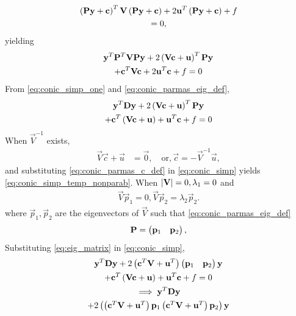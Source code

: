 \documentclass[journal,12pt,twocolumn]{IEEEtran}
\renewcommand\thesection{\arabic{section}}
\renewcommand\thesubsection{\thesection.\arabic{subsection}}
\begin{document}
\begin{enumerate}[label=\thesubsection.\arabic*.,ref=\thesubsection.\theenumi]
\begin{multline}
\left(\mathbf{P}\mathbf{y}+\mathbf{c}\right)^T\mathbf{V}\left(\mathbf{P}\mathbf{y}+\mathbf{c}\right)+2\mathbf{u}^T\left(\mathbf{P}\mathbf{y}+\mathbf{c}\right)+ f
	\\
	= 0, 
\end{multline}
yielding 
\begin{multline}
\mathbf{y}^T\mathbf{P}^T\mathbf{V}\mathbf{P}\mathbf{y}+2\left(\mathbf{V}\mathbf{c}+\mathbf{u}\right)^T\mathbf{P}\mathbf{y}
\\
+  \mathbf{c}^T\mathbf{V}\mathbf{c} + 2\mathbf{u}^T\mathbf{c} + f= 0
\label{eq:conic_simp_one}
\end{multline}
%
From \eqref{eq:conic_simp_one} and \eqref{eq:conic_parmas_eig_def},
\begin{multline}
\mathbf{y}^T\mathbf{D}\mathbf{y}+2\left(\mathbf{V}\mathbf{c}+\mathbf{u}\right)^T\mathbf{P}\mathbf{y}
\\
+  \mathbf{c}^T\left(\mathbf{V}\mathbf{c} + \mathbf{u}\right)+ \mathbf{u}^T\mathbf{c} + f= 0
\label{eq:conic_simp}
\end{multline}
When $\vec{V}^{-1}$ exists,
\begin{align}
\vec{V}\vec{c}+\vec{u} &= \vec{0}, \quad \text{or}, \vec{c} = -\vec{V}^{-1}\vec{u},
\label{eq:conic_parmas_c_def}
\end{align}
%
and substituting \eqref{eq:conic_parmas_c_def}
in \eqref{eq:conic_simp}
yields \eqref{eq:conic_simp_temp_nonparab}. 
When $\left\vert\mathbf{V}\right\vert = 0, \lambda_1 = 0$ and 
\begin{align}
\vec{V}\vec{p}_1 = 0, 
\vec{V}\vec{p}_2 = \lambda_2\vec{p}_2.
\label{eq:conic_parab_eig_prop} 
\end{align}
where $\vec{p}_1,\vec{p}_2$ are the eigenvectors of $\vec{V}$ such that  \eqref{eq:conic_parmas_eig_def}
%
\begin{align}
\mathbf{P} = \begin{pmatrix}\mathbf{p}_1 & \mathbf{p}_2\end{pmatrix},
\label{eq:eig_matrix}
\end{align}
Substituting \eqref{eq:eig_matrix}
in \eqref{eq:conic_simp},
\begin{multline}
	\vec{y}^T\vec{D}\vec{y}+2\brak{\vec{c}^T\vec{V}+\vec{u}^T}\myvec{\vec{p}_1 & \vec{p}_2}\vec{y}
\\
+  \vec{c}^T\brak{\vec{V}\vec{c} + \vec{u}}+ \vec{u}^T\vec{c} + f= 0
\\
\implies \vec{y}^T\vec{D}\vec{y}
\\
+2\myvec{\brak{\vec{c}^T\vec{V}+\vec{u}^T}\vec{p}_1  \brak{\vec{c}^T\vec{V}+\vec{u}^T}\vec{p}_2}\vec{y}

\end{multline}
\end{enumerate}
\end{document}

